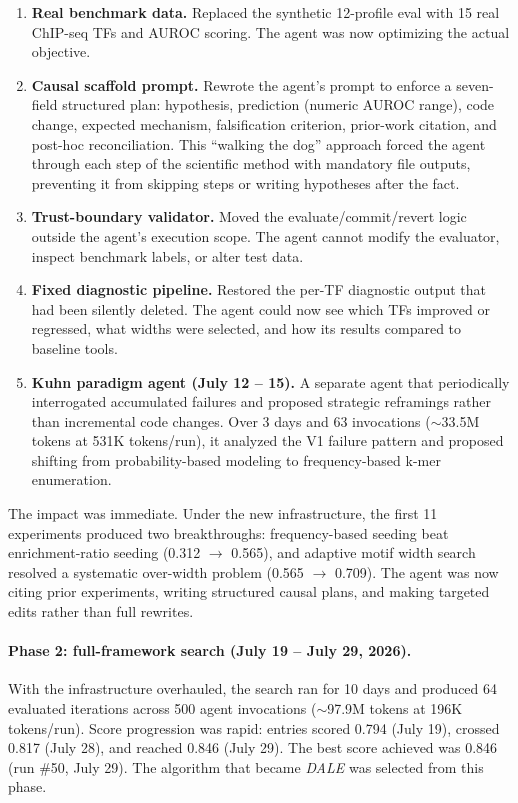 \documentclass[11pt,a4paper]{article}
\begin{document}
\begin{enumerate}
    \item \textbf{Real benchmark data.} Replaced the synthetic 12-profile eval with 15 real ChIP-seq TFs and AUROC scoring. The agent was now optimizing the actual objective.
    
    \item \textbf{Causal scaffold prompt.} Rewrote the agent's prompt to enforce a seven-field structured plan: hypothesis, prediction (numeric AUROC range), code change, expected mechanism, falsification criterion, prior-work citation, and post-hoc reconciliation. This ``walking the dog'' approach forced the agent through each step of the scientific method with mandatory file outputs, preventing it from skipping steps or writing hypotheses after the fact.
    
    \item \textbf{Trust-boundary validator.} Moved the evaluate/commit/revert logic outside the agent's execution scope. The agent cannot modify the evaluator, inspect benchmark labels, or alter test data.
    
    \item \textbf{Fixed diagnostic pipeline.} Restored the per-TF diagnostic output that had been silently deleted. The agent could now see which TFs improved or regressed, what widths were selected, and how its results compared to baseline tools.
    
    \item \textbf{Kuhn paradigm agent (July 12 -- 15).} A separate agent that periodically interrogated accumulated failures and proposed strategic reframings rather than incremental code changes. Over 3 days and 63 invocations ($\sim$33.5M tokens at 531K tokens/run), it analyzed the V1 failure pattern and proposed shifting from probability-based modeling to frequency-based k-mer enumeration.
\end{enumerate}

The impact was immediate. Under the new infrastructure, the first 11 experiments produced two breakthroughs: frequency-based seeding beat enrichment-ratio seeding (0.312 $\rightarrow$ 0.565), and adaptive motif width search resolved a systematic over-width problem (0.565 $\rightarrow$ 0.709). The agent was now citing prior experiments, writing structured causal plans, and making targeted edits rather than full rewrites.

\paragraph{Phase 2: full-framework search (July 19 -- July 29, 2026).}
With the infrastructure overhauled, the search ran for 10 days and produced 64 evaluated iterations across 500 agent invocations ($\sim$97.9M tokens at 196K tokens/run). Score progression was rapid: entries scored 0.794 (July 19), crossed 0.817 (July 28), and reached 0.846 (July 29). The best score achieved was 0.846 (run \#50, July 29). The algorithm that became \emph{DALE} was selected from this phase.
\end{document}
